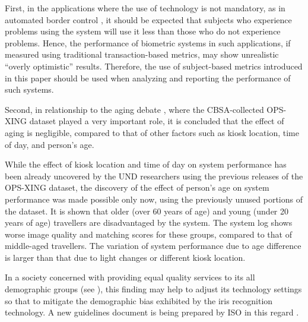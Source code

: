 \documentclass{cta-author}%
\newcommand{\cmt}[1]{}
\begin{document}
First, in the applications where the use of technology is not mandatory,  as in automated border control \cite{GorodnichyARTinABC}, it should  be expected that subjects who experience problems using the system will use it less  than those who do not experience  problems. 
Hence, the performance of biometric systems in such applications, if  measured using traditional transaction-based metrics, may show unrealistic ``overly optimistic'' results. Therefore, the use of subject-based metrics introduced in this paper should be used when analyzing and reporting the performance of such systems. 


Second, in relationship to the aging debate \cite{IET0}, where the CBSA-collected OPS-XING dataset played a very important role, 
it is concluded that the effect of aging is negligible, compared to that of other factors such as kiosk location, time of day, and person's age.

\cmt{
Additionally, 
using the previously unused portions of the OPS-XING dataset,
it is shown that
kiosk performance 
is also affected by traveller's age.
}


While the effect of kiosk location and time of day on system performance has been  already uncovered by the UND researchers \cite{Bowyer-BTAS2016} using the previous releases of the OPS-XING dataset, the discovery of the effect of person's age on system performance was made possible only now, using the previously unused portions of the dataset.
It is shown that older (over 60 years  of age) and young (under 20 years of age) travellers are disadvantaged by the system. 
The system log shows  worse image quality and  matching scores for these groups, compared to that of middle-aged travellers. 
The variation of system performance due to age difference is larger than that due to light changes or different kiosk location.

In a society concerned with providing equal quality services to its all demographic groups (see \cite{GBA}), this finding may help to adjust its technology settings so that to mitigate  the demographic bias exhibited by the iris recognition technology. A new guidelines  document is being prepared by ISO in this regard \cite{ISO-bias}. 
\end{document}
